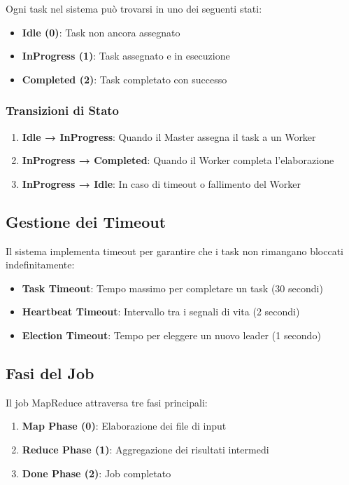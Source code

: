 \documentclass[12pt,a4paper]{article}
\begin{document}
Ogni task nel sistema può trovarsi in uno dei seguenti stati:

\begin{itemize}
\item \textbf{Idle (0)}: Task non ancora assegnato
\item \textbf{InProgress (1)}: Task assegnato e in esecuzione
\item \textbf{Completed (2)}: Task completato con successo
\end{itemize}

\subsubsection{Transizioni di Stato}

\begin{enumerate}
\item \textbf{Idle → InProgress}: Quando il Master assegna il task a un Worker
\item \textbf{InProgress → Completed}: Quando il Worker completa l'elaborazione
\item \textbf{InProgress → Idle}: In caso di timeout o fallimento del Worker
\end{enumerate}

\subsection{Gestione dei Timeout}

Il sistema implementa timeout per garantire che i task non rimangano bloccati indefinitamente:

\begin{itemize}
\item \textbf{Task Timeout}: Tempo massimo per completare un task (30 secondi)
\item \textbf{Heartbeat Timeout}: Intervallo tra i segnali di vita (2 secondi)
\item \textbf{Election Timeout}: Tempo per eleggere un nuovo leader (1 secondo)
\end{itemize}

\subsection{Fasi del Job}

Il job MapReduce attraversa tre fasi principali:

\begin{enumerate}
\item \textbf{Map Phase (0)}: Elaborazione dei file di input
\item \textbf{Reduce Phase (1)}: Aggregazione dei risultati intermedi
\item \textbf{Done Phase (2)}: Job completato
\end{enumerate}
\end{document}
